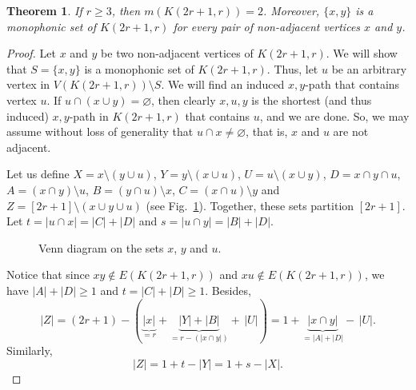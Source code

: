 \documentclass[a4paper,11pt]{article}
\newtheorem{theorem}{Theorem}
\renewcommand{\emptyset}{\varnothing}
\begin{document}
\begin{theorem}\label{thm:odd-strong}
    If $r\geq 3$, then $m(K(2r+1,r))=2$. 
    Moreover, $\{x,y\}$ is a monophonic set of $K(2r+1,r)$ for every pair of non-adjacent vertices $x$ and $y$.
\end{theorem}
\begin{proof}
    Let $x$ and $y$ be two non-adjacent vertices of $K(2r+1,r)$. We will show that $S=\{x,y\}$ is a monophonic set of $K(2r+1,r)$. Thus, let $u$ be an arbitrary vertex in $V(K(2r+1,r))\setminus S$. We will find an induced $x,y$-path that contains vertex $u$.
    If $u\cap(x \cup y)=\emptyset$, then clearly $x,u,y$ is the shortest (and thus induced) $x,y$-path in $K(2r+1,r)$ that contains $u$, and we are done. So, we may assume without loss of generality that $u\cap x\neq\emptyset$, that is, $x$ and $u$ are not adjacent. 
    
    Let us define $X=x\setminus(y\cup u)$, $Y=y\setminus(x\cup u)$, $U=u\setminus(x\cup y)$, $D=x\cap y\cap u$, $A=(x\cap y)\setminus u$, $B=(y\cap u)\setminus x$, $C=(x\cap u)\setminus y$ and $Z=[2r+1]\setminus(x\cup y\cup u)$ (see Fig.~\ref{fig:venn-xyu}). Together, these sets partition $[2r+1]$. Let $t=|u\cap x|=|C|+|D|$ and $s=|u\cap y|=|B|+|D|$.

    \begin{figure}[ht]
        \centering
        \caption{Venn diagram on the sets $x$, $y$ and $u$.}
        \label{fig:venn-xyu}
    \end{figure}
    
    Notice that since $xy \notin E(K(2r+1,r))$ and $xu \notin E(K(2r+1,r))$, we have $|A|+|D|\geq 1$ and $t=|C|+|D|\geq 1$. Besides,
    \begin{equation}\label{eq:cardinality Z}
        |Z|=(2r+1)-(\underbrace{|x|}_{=r}+\underbrace{|Y|+|B|}_{=r-(|x\cap y|)}+\,|U|)=1+\underbrace{|x\cap y|}_{=|A|+|D|}- \, |U|.
    \end{equation}
    Similarly,
    \begin{equation}\label{eq:cardinality Z-2}
        |Z|=1+t-|Y|=1+s-|X|.
    \end{equation}


\end{proof}
\end{document}

